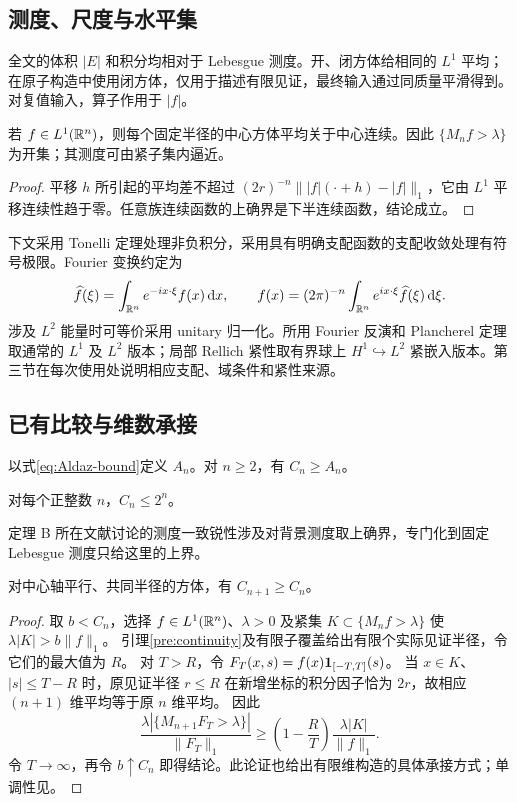 \subsection{测度、尺度与水平集}
全文的体积 $|E|$ 和积分均相对于 Lebesgue 测度。开、闭方体给相同的 $L^1$ 平均；在原子构造中使用闭方体，仅用于描述有限见证，最终输入通过同质量平滑得到。对复值输入，算子作用于 $|f|$。

\begin{lemma}\label{pre:continuity}
若 $f\in L^1(\mathbb{R}^n)$，则每个固定半径的中心方体平均关于中心连续。因此 $\{M_nf>\lambda\}$ 为开集；其测度可由紧子集内逼近。
\end{lemma}
\begin{proof}
平移 $h$ 所引起的平均差不超过
$(2r)^{-n}\||f|(\cdot+h)-|f|\|_1$，它由 $L^1$ 平移连续性趋于零。任意族连续函数的上确界是下半连续函数，结论成立。
\end{proof}

下文采用 Tonelli 定理处理非负积分，采用具有明确支配函数的支配收敛处理有符号极限。Fourier 变换约定为
\[
 \widehat f(\xi)=\int_{\mathbb{R}^n}e^{-ix\cdot\xi}f(x)\,\mathrm d x,
 \qquad f(x)=(2\pi)^{-n}\int_{\mathbb{R}^n}e^{ix\cdot\xi}\widehat f(\xi)\,\mathrm d\xi.
\]
涉及 $L^2$ 能量时可等价采用 unitary 归一化。所用 Fourier 反演和 Plancherel 定理取通常的 $L^1$ 及 $L^2$ 版本\cite{Folland1999}；局部 Rellich 紧性取有界球上 $H^1\hookrightarrow L^2$ 紧嵌入版本\cite{Evans2010}。第三节在每次使用处说明相应支配、域条件和紧性来源。

\subsection{已有比较与维数承接}
\begin{oldtheorem}\label{pre:old-lower}
以式\eqref{eq:Aldaz-bound}定义 $A_n$。对 $n\ge2$，有 $C_n\ge A_n$\cite{Aldaz2000}。
\end{oldtheorem}
\begin{oldtheorem}\label{pre:old-upper}
对每个正整数 $n$，$C_n\le2^n$\cite[Corollary 3.5]{AldazKissing2020}。
\end{oldtheorem}
定理 B 所在文献讨论的测度一致锐性涉及对背景测度取上确界，专门化到固定 Lebesgue 测度只给这里的上界。

\begin{lemma}\label{pre:dimension}
对中心轴平行、共同半径的方体，有 $C_{n+1}\ge C_n$。
\end{lemma}
\begin{proof}
取 $b<C_n$，选择 $f\in L^1(\mathbb{R}^n)$、$\lambda>0$ 及紧集
$K\subset\{M_nf>\lambda\}$ 使 $\lambda|K|>b\|f\|_1$。
引理\ref{pre:continuity}及有限子覆盖给出有限个实际见证半径，令它们的最大值为 $R$。
对 $T>R$，令 $F_T(x,s)=f(x)\mathbf{1}_{[-T,T]}(s)$。
当 $x\in K$、$|s|\le T-R$ 时，原见证半径 $r\le R$ 在新增坐标的积分因子恰为 $2r$，故相应 $(n+1)$ 维平均等于原 $n$ 维平均。
因此
\[
 \frac{\lambda|\{M_{n+1}F_T>\lambda\}|}{\|F_T\|_1}
 \ge\left(1-\frac RT\right)\frac{\lambda|K|}{\|f\|_1}.
\]
令 $T\to\infty$，再令 $b\uparrow C_n$ 即得结论。此论证也给出有限维构造的具体承接方式；单调性见\cite{Aldaz2011}。
\end{proof}


